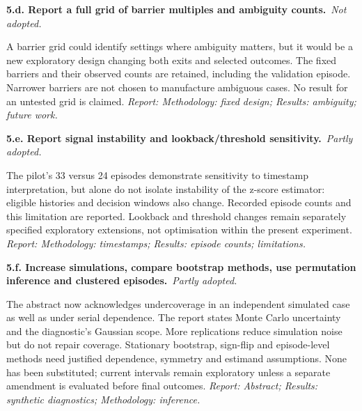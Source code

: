 \documentclass[11pt,a4paper]{article}
\newcommand{\reply}[3]{\par\addvspace{5pt}\noindent\textbf{#1. #2}\ \textit{#3.}\par\nobreak}
\begin{document}
\par\noindent\begin{minipage}{\linewidth}\justifying
\reply{5.d}{Report a full grid of barrier multiples and ambiguity counts.}{Not adopted}
A barrier grid could identify settings where ambiguity matters, but it would be a new exploratory design changing both exits and selected outcomes. The fixed barriers and their observed counts are retained, including the validation episode. Narrower barriers are not chosen to manufacture ambiguous cases. No result for an untested grid is claimed.
{\small\textit{Report: Methodology: fixed design; Results: ambiguity; future work.}}
\end{minipage}\par\addvspace{5pt}

\par\noindent\begin{minipage}{\linewidth}\justifying
\reply{5.e}{Report signal instability and lookback/threshold sensitivity.}{Partly adopted}
The pilot's 33 versus 24 episodes demonstrate sensitivity to timestamp interpretation, but alone do not isolate instability of the z-score estimator: eligible histories and decision windows also change. Recorded episode counts and this limitation are reported. Lookback and threshold changes remain separately specified exploratory extensions, not optimisation within the present experiment.
{\small\textit{Report: Methodology: timestamps; Results: episode counts; limitations.}}
\end{minipage}\par\addvspace{5pt}

\par\noindent\begin{minipage}{\linewidth}\justifying
\reply{5.f}{Increase simulations, compare bootstrap methods, use permutation inference and clustered episodes.}{Partly adopted}
The abstract now acknowledges undercoverage in an independent simulated case as well as under serial dependence. The report states Monte Carlo uncertainty and the diagnostic's Gaussian scope. More replications reduce simulation noise but do not repair coverage. Stationary bootstrap, sign-flip and episode-level methods need justified dependence, symmetry and estimand assumptions. None has been substituted; current intervals remain exploratory unless a separate amendment is evaluated before final outcomes.
{\small\textit{Report: Abstract; Results: synthetic diagnostics; Methodology: inference.}}
\end{minipage}\par\addvspace{5pt}
\end{document}
